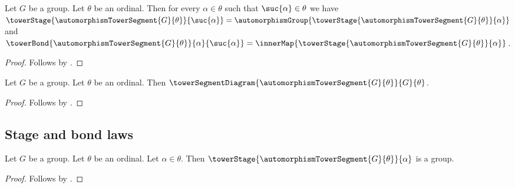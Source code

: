 \begin{proposition}\label{automorphism_tower_successor_law}
    Let $G$ be a group.
    Let $\theta$ be an ordinal.
    Then for every $\alpha\in\theta$ such that
        $\suc{\alpha}\in\theta$ we have
        $\towerStage{\automorphismTowerSegment{G}{\theta}}{\suc{\alpha}}=
            \automorphismGroup{\towerStage{
                \automorphismTowerSegment{G}{\theta}}{\alpha}}$ and
        $\towerBond{\automorphismTowerSegment{G}{\theta}}
                {\alpha}{\suc{\alpha}}=
            \innerMap{\towerStage{
                \automorphismTowerSegment{G}{\theta}}{\alpha}}$.
\end{proposition}
\begin{proof}
    Follows by
        .
\end{proof}

\begin{theorem}\label{automorphism_tower_segment_is_diagram}
    Let $G$ be a group.
    Let $\theta$ be an ordinal.
    Then $\towerSegmentDiagram
        {\automorphismTowerSegment{G}{\theta}}{G}{\theta}$.
\end{theorem}
\begin{proof}
    Follows by
        .
\end{proof}

\subsection{Stage and bond laws}

\begin{proposition}\label{automorphism_tower_segment_stage_is_group}
    Let $G$ be a group.
    Let $\theta$ be an ordinal.
    Let $\alpha\in\theta$.
    Then $\towerStage{\automorphismTowerSegment{G}{\theta}}{\alpha}$
        is a group.
\end{proposition}
\begin{proof}
    Follows by
        .
\end{proof}

